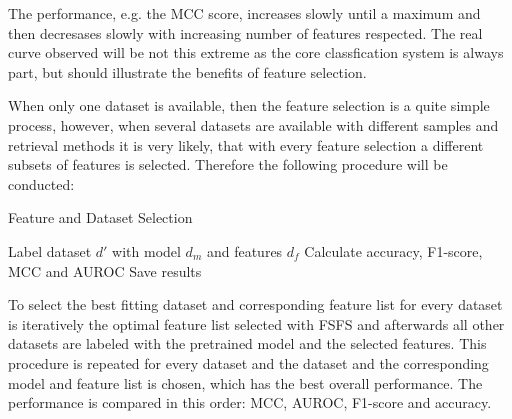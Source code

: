 The performance, e.g. the \gls{MCC} score, increases slowly until a maximum and then decresases slowly with
increasing number of features respected. The real curve observed will be not this extreme as the core
classfication system is always part, but should illustrate the benefits of feature selection.

When only one dataset is available, then the feature selection is a quite simple process, however, when
several datasets are available with different samples and retrieval methods it is very likely,
that with every feature selection a different subsets of features is selected. Therefore the
following procedure will be conducted:
\begin{algorithm}[htb]
    \caption{Feature and Dataset Selection}\label{alg:feature_dataset_selection}
    \begin{algorithmic}[1]
        \State Label dataset $d'$ with model $d_m$ and features $d_f$
        \State Calculate accuracy, F1-score, \gls{MCC} and \gls{AUROC}
        \State Save results
        \EndFor
        \EndFor
        \EndProcedure
    \end{algorithmic}
\end{algorithm}

To select the best fitting dataset and corresponding feature list for every dataset is iteratively
the optimal feature list selected with \gls{FSFS} and afterwards all other datasets are labeled
with the pretrained model and the selected features. This procedure is repeated for every dataset
and the dataset and the corresponding model and feature list is chosen, which has the best overall
performance. The performance is compared in this order: \gls{MCC}, \gls{AUROC}, F1-score and accuracy.

